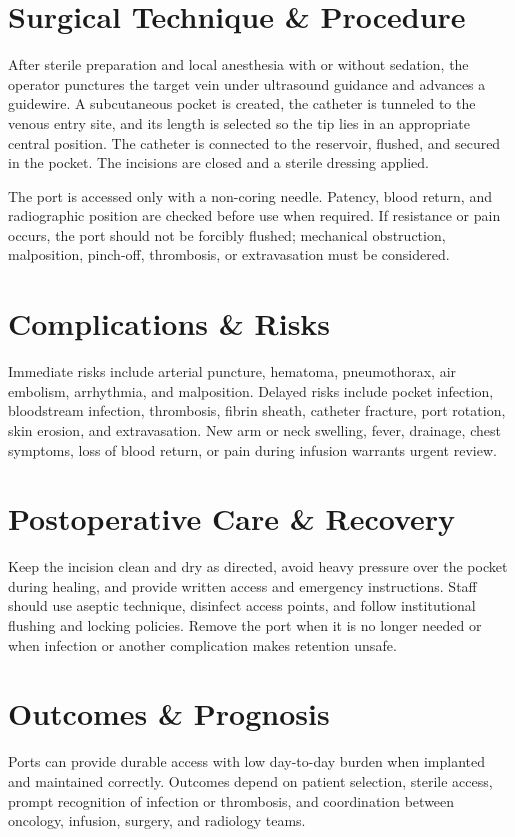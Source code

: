 \section*{Surgical Technique \& Procedure}
After sterile preparation and local anesthesia with or without sedation, the operator punctures the target vein under ultrasound guidance and advances a guidewire. A subcutaneous pocket is created, the catheter is tunneled to the venous entry site, and its length is selected so the tip lies in an appropriate central position. The catheter is connected to the reservoir, flushed, and secured in the pocket. The incisions are closed and a sterile dressing applied.

The port is accessed only with a non-coring needle. Patency, blood return, and radiographic position are checked before use when required. If resistance or pain occurs, the port should not be forcibly flushed; mechanical obstruction, malposition, pinch-off, thrombosis, or extravasation must be considered.

\section*{Complications \& Risks}
Immediate risks include arterial puncture, hematoma, pneumothorax, air embolism, arrhythmia, and malposition. Delayed risks include pocket infection, bloodstream infection, thrombosis, fibrin sheath, catheter fracture, port rotation, skin erosion, and extravasation. New arm or neck swelling, fever, drainage, chest symptoms, loss of blood return, or pain during infusion warrants urgent review.

\section*{Postoperative Care \& Recovery}
Keep the incision clean and dry as directed, avoid heavy pressure over the pocket during healing, and provide written access and emergency instructions. Staff should use aseptic technique, disinfect access points, and follow institutional flushing and locking policies. Remove the port when it is no longer needed or when infection or another complication makes retention unsafe.

\section*{Outcomes \& Prognosis}
Ports can provide durable access with low day-to-day burden when implanted and maintained correctly. Outcomes depend on patient selection, sterile access, prompt recognition of infection or thrombosis, and coordination between oncology, infusion, surgery, and radiology teams.

